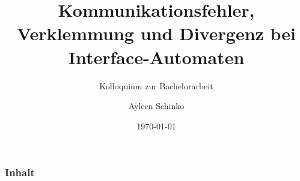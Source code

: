 \documentclass[mathserif, xcolor=dvipsnames]{beamer}
\title{Kommunikationsfehler, Verklemmung und Divergenz bei Interface-Automaten}
\subtitle{Kolloquium zur Bachelorarbeit}
\author{Ayleen Schinko}
\date{\today}
\begin{document}
\begin{frame}[plain]
\maketitle
\end{frame}

\begin{frame}
  \frametitle{Inhalt}
  \tableofcontents{}
\end{frame}








\end{document}
